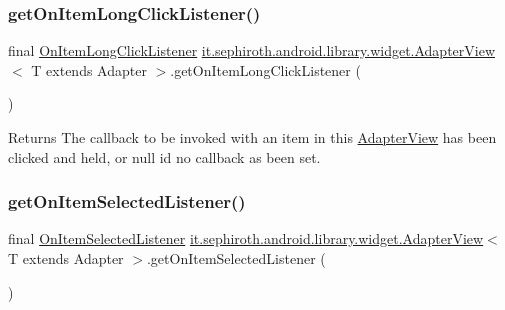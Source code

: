 \subsubsection{\texorpdfstring{get\+On\+Item\+Long\+Click\+Listener()}{getOnItemLongClickListener()}}
{\footnotesize\ttfamily final \hyperlink{interfaceit_1_1sephiroth_1_1android_1_1library_1_1widget_1_1_adapter_view_1_1_on_item_long_click_listener}{On\+Item\+Long\+Click\+Listener} \hyperlink{classit_1_1sephiroth_1_1android_1_1library_1_1widget_1_1_adapter_view}{it.\+sephiroth.\+android.\+library.\+widget.\+Adapter\+View}$<$ T extends Adapter $>$.get\+On\+Item\+Long\+Click\+Listener (\begin{DoxyParamCaption}{ }\end{DoxyParamCaption})}

\begin{DoxyReturn}{Returns}
The callback to be invoked with an item in this \hyperlink{classit_1_1sephiroth_1_1android_1_1library_1_1widget_1_1_adapter_view}{Adapter\+View} has been clicked and held, or null id no callback as been set. 
\end{DoxyReturn}
\mbox{\label{classit_1_1sephiroth_1_1android_1_1library_1_1widget_1_1_adapter_view_afb9e4909cf452262c55bcd2d622a1649}} 
\subsubsection{\texorpdfstring{get\+On\+Item\+Selected\+Listener()}{getOnItemSelectedListener()}}
{\footnotesize\ttfamily final \hyperlink{interfaceit_1_1sephiroth_1_1android_1_1library_1_1widget_1_1_adapter_view_1_1_on_item_selected_listener}{On\+Item\+Selected\+Listener} \hyperlink{classit_1_1sephiroth_1_1android_1_1library_1_1widget_1_1_adapter_view}{it.\+sephiroth.\+android.\+library.\+widget.\+Adapter\+View}$<$ T extends Adapter $>$.get\+On\+Item\+Selected\+Listener (\begin{DoxyParamCaption}{ }\end{DoxyParamCaption})}

